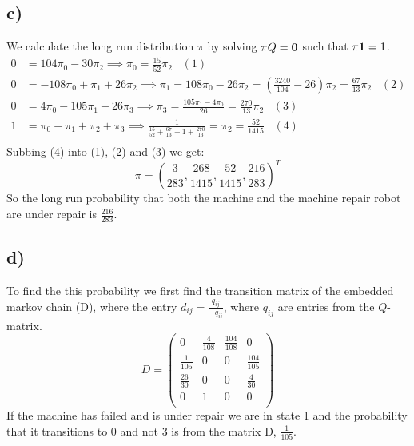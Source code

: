\documentclass{article}
\begin{document}
\subsection*{c)}
We calculate the long run distribution $\pi$ by solving $\pi Q=\bold{0}$ such that $\pi\bold{1}=1$.
\begin{align*}
0&=104\pi_0-30\pi_2\implies \pi_0=\frac{15}{52}\pi_2\;\;\;(1)\\
0&=-108\pi_0+\pi_1+26\pi_2\implies\pi_1=108\pi_0-26\pi_2=(\frac{3240}{104}-26)\pi_2=\frac{67}{13}\pi_2\;\;\;(2)\\
0&=4\pi_0-105\pi_1+26\pi_3\implies\pi_3=\frac{105\pi_1-4\pi_0}{26}=\frac{270}{13}\pi_2\;\;\;(3)\\
1&=\pi_0+\pi_1+\pi_2+\pi_3\implies \frac{1}{\frac{15}{52}+\frac{67}{13}+1+\frac{270}{13}}=\pi_2=\frac{52}{1415}\;\;\;(4)\\
\end{align*}
Subbing (4) into (1), (2) and (3) we get:
$$\pi=\left(\frac{3}{283},\frac{268}{1415},\frac{52}{1415},\frac{216}{283}\right)^T$$
So the long run probability that both the machine and the machine repair
robot are under repair is $\frac{216}{283}$.
\subsection*{d)}
To find the this probability we first find the transition matrix of the embedded markov chain (D), where the entry $d_{ij}=\frac{q_{ij}}{-q_{ii}}$, where $q_{ij}$ are entries from the $Q$-matrix.
$$D=\begin{pmatrix}
0 & \frac{4}{108} & \frac{104}{108} & 0\\
\frac{1}{105} & 0 & 0 & \frac{104}{105}\\
\frac{26}{30} & 0 & 0 & \frac{4}{30}\\
0 & 1 & 0 & 0\\
\end{pmatrix}$$
If the machine has failed and is under repair we are in state 1 and the probability that it transitions to 0 and not 3 is from the matrix D, $\frac{1}{105}$.
\end{document}
